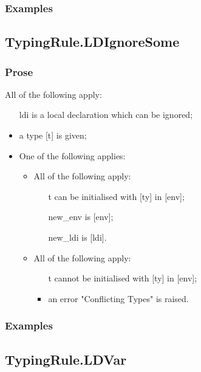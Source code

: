 \documentclass{book}
\begin{document}
    \subsubsection{Examples}

\subsection{TypingRule.LDIgnoreSome}

    \subsubsection{Prose}
    All of the following apply:
   \begin{itemize}
   \item [ldi] is a local declaration which can be ignored;
   \item a type [t] is given;
   \item One of the following applies:
     \begin{itemize}
     \item All of the following apply:
       \begin{itemize}
       \item [t] can be initialised with [ty] in [env];
       \item [new\_env] is [env];
       \item [new\_ldi] is [ldi].
       \end{itemize}
     \item All of the following apply:
       \begin{itemize}
       \item [t] cannot be initialised with [ty] in [env];
       \item an error "Conflicting Types" is raised.
       \end{itemize}
     \end{itemize}
   \end{itemize}

    \subsubsection{Examples}

\subsection{TypingRule.LDVar}
\end{document}
